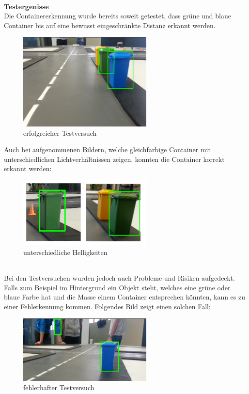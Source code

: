 \\[0.2cm]
\textbf{Testergenisse} \\
Die Containererkennung wurde bereits soweit getestet, dass grüne und blaue Container bis auf eine bewusst eingeschränkte Distanz erkannt werden. 
\begin{figure}[H]%
\centering
\includegraphics[width=0.6\textwidth]{03_Loesungskonzept/pictures/containererkennung_blau_gruen.png}
\caption{erfolgreicher Testversuch}
\label{fig:erfolgreicher Testversuch}
\end{figure}
Auch bei aufgenommenen Bildern, welche gleichfarbige Container mit unterschiedlichen Lichtverhältnissen zeigen, konnten die Container korrekt erkannt werden:
\begin{figure}[H]%
\centering
\includegraphics[width=0.6\textwidth]{03_Loesungskonzept/pictures/containererkennung_div_brightness.png}
\caption{unterschiedliche Helligkeiten}
\label{fig:unterschiedliche Helligkeiten}
\end{figure} \\
Bei den Testversuchen wurden jedoch auch Probleme und Risiken aufgedeckt. Falls zum Beispiel im Hintergrund ein Objekt steht, welches eine grüne oder blaue Farbe hat und die Masse einem Container entsprechen könnten, kann es zu einer Fehlerkennung kommen. Folgendes Bild zeigt einen solchen Fall:
\begin{figure}[H]%
\centering
\includegraphics[width=0.6\textwidth]{03_Loesungskonzept/pictures/objekterkennung_blau_fehl.png}
\caption{fehlerhafter Testversuch}
\label{fig:fehlerhafter Testversuch}
\end{figure} \\
